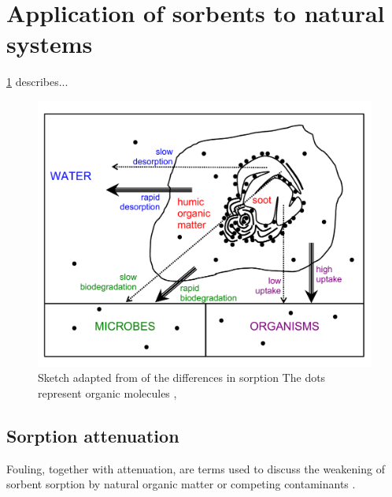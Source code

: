 \section{Application of sorbents to natural systems}

\cref{fig:cornelissen_sorption} describes...

\begin{figure}
    \centering
    \includegraphics[width=\textwidth]{Diagrams/Cornelissen_sorption.pdf}
    \caption{Sketch adapted from \citep{Cornelissen2005} of the differences in sorption The dots represent organic molecules , }
    \label{fig:cornelissen_sorption}
\end{figure}

\subsection{Sorption attenuation}
Fouling, together with attenuation, are terms used to discuss the weakening of sorbent sorption by natural organic matter or competing contaminants \citep{Werner2006}.